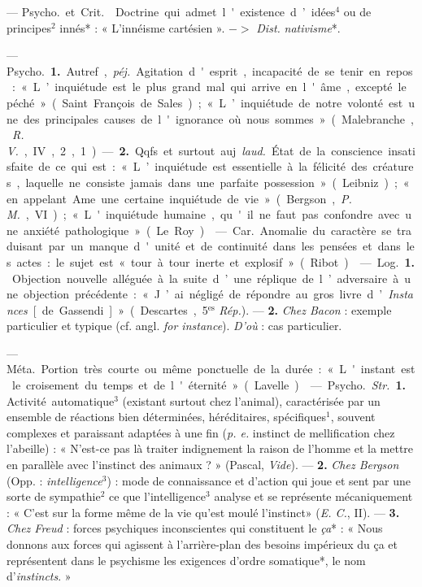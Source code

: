 \begin{itemize}[leftmargin=1cm, label=, itemsep=1pt]
 — \si{Psycho.} et \si{Crit.}  Doctrine qui admet
l'existence d’idées$^4$ ou de principes$^2$ innés* : « L’innéisme
cartésien ». $->$ {\it Dist.} {\it nativisme}*.

 — \si{Psycho.} {\bf 1.} Autref., {\it péj.} Agitation
d'esprit, incapacité de se tenir en repos : « L’inquiétude est le plus grand
mal qui arrive en l'âme,
excepté le péché » (Saint François de Sales); « L’inquiétude de notre volonté
est une des principales causes de l'ignorance où nous sommes » (Malebranche,
{\it R. V.}, IV, 2, 1). — {\bf 2.} Qqfs. et surtout auj. {\it laud.} État de
la conscience insatisfaite de ce qui est : « L’inquiétude est essentielle à
la félicité des créatures, laquelle ne consiste jamais dans une parfaite
possession » (Leibniz); « ... en appelant Ame une certaine inquiétude de
vie » (Bergson, {\it P. M.}, VI); « L'inquiétude humaine, qu'il ne faut pas
confondre avec une anxiété pathologique... » (Le Roy).

 — \si{Car.} Anomalie du caractère se traduisant par
un manque d'unité et de continuité dans les pensées et dans les actes : le
sujet est « tour à tour inerte et explosif » (Ribot).

 — \si{Log.} {\bf 1.} Objection nouvelle alléguée à la suite
d’une réplique de l’adversaire à une objection précédente : « J’ai négligé de
répondre au gros livre d’{\it Instances} [de Gassendi] » (Descartes,
5$^\text{es}$ {\it Rép.}). — {\bf 2.} {\it Chez Bacon} : exemple particulier
et typique (cf. angl. {\it for instance}). {\it D'où} : cas particulier.

 — \si{Méta.} Portion très courte ou même ponctuelle de la
durée : « L'instant est le croisement du temps et de l'éternité » (Lavelle).

 — \si{Psycho.} {\it Str.} {\bf 1.} Activité automatique$^3$
(existant surtout chez l'animal), caractérisée par un ensemble de réactions
bien déterminées, héréditaires, spécifiques$^1$, souvent complexes et
paraissant adaptées à une fin ({\it p. e.} instinct de mellification chez
l’abeille) : « N’est-ce pas là traiter indignement la
raison de l’homme et la mettre en parallèle avec l'instinct des
animaux ? » (Pascal, {\it Vide}). — {\bf 2.} {\it Chez Bergson} (Opp. :
{\it intelligence}$^3$) : mode de connaissance et d’action qui joue et sent
par une sorte de sympathie$^2$ ce que l'intelligence$^3$ analyse et se
représente mécaniquement : « C’est sur la forme même de la vie qu'est moulé
l'instinct» ({\it E. C.}, II). —  {\bf 3.} {\it Chez Freud} : forces psychiques
inconscientes qui constituent le {\it ça}* : « Nous donnons aux forces qui
agissent à l'arrière-plan des besoins impérieux du ça et représentent dans le
psychisme les exigences d’ordre somatique*, le nom d’{\it instincts}. »


\end{itemize}
